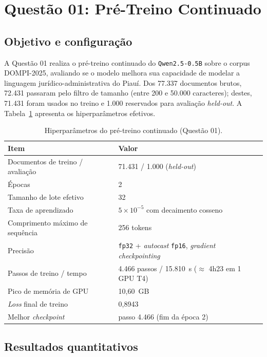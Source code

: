 \section{Questão 01: Pré-Treino Continuado}
\label{sec:q1}

\subsection{Objetivo e configuração}

A Questão 01 realiza o pré-treino continuado do \texttt{Qwen2.5-0.5B} sobre o corpus
DOMPI-2025, avaliando se o modelo melhora sua capacidade de modelar a linguagem
jurídico-administrativa do Piauí. Dos 77.337 documentos brutos, 72.431 passaram pelo
filtro de tamanho (entre 200 e 50.000 caracteres); destes, 71.431 foram usados no
treino e 1.000 reservados para avaliação \textit{held-out}. A
Tabela~\ref{tab:q1-hiper} apresenta os hiperparâmetros efetivos.

\begin{table}[ht]
  \centering
  \caption{Hiperparâmetros do pré-treino continuado (Questão 01).}
  \label{tab:q1-hiper}
  \footnotesize
  \begin{tabularx}{0.92\textwidth}{@{}l X@{}}
    \toprule
    \textbf{Item} & \textbf{Valor} \\
    \midrule
    Documentos de treino / avaliação & 71.431 / 1.000 (\textit{held-out}) \\
    Épocas & 2 \\
    Tamanho de lote efetivo & 32 \\
    Taxa de aprendizado & $5 \times 10^{-5}$ com decaimento cosseno \\
    Comprimento máximo de sequência & 256 tokens \\
    Precisão & \texttt{fp32} + \textit{autocast} \texttt{fp16}, \textit{gradient checkpointing} \\
    Passos de treino / tempo & 4.466 passos / 15.810~s ($\approx$ 4h23 em 1 GPU T4) \\
    Pico de memória de GPU & 10,60~GB \\
    \textit{Loss} final de treino & 0,8943 \\
    Melhor \textit{checkpoint} & passo 4.466 (fim da época 2) \\
    \bottomrule
  \end{tabularx}
\end{table}

\subsection{Resultados quantitativos}


